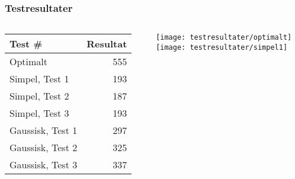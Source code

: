 \begin{frame}
\frametitle{Testresultater}
\begin{columns}
\begin{column}{.59\textwidth}
\begin{center}
\begin{tabular}{|l|r|}
\hline
\textbf{Test \#} & \textbf{Resultat} \\ \hline \hline
Optimalt & 555 \\ \hline \hline
Simpel, Test 1 & 193 \\ \hline
Simpel, Test 2 & 187 \\ \hline
Simpel, Test 3 & 193 \\ \hline \hline
Gaussisk, Test 1 & 297 \\ \hline
Gaussisk, Test 2 & 325 \\ \hline
Gaussisk, Test 3 & 337 \\ \hline
\end{tabular}
\end{center}
\end{column}
\begin{column}{.40\textwidth}
\texttt{[image: testresultater/optimalt]}\\
\texttt{[image: testresultater/simpel1]}
\end{column}
\end{columns}
\end{frame}